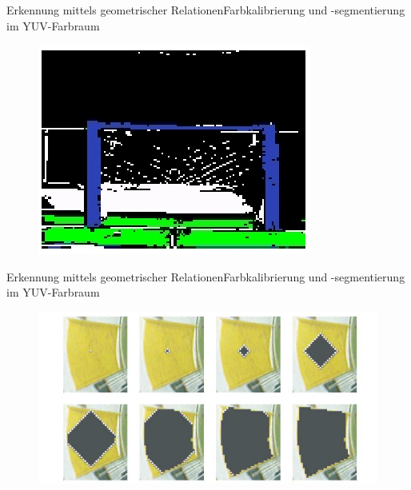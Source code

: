 \documentclass{beamer}
\begin{document}
\begin{frame}{Erkennung mittels geometrischer Relationen}{Farbkalibrierung und -segmentierung im YUV-Farbraum}
\begin{figure}[htp]
\centering
\includegraphics[scale=0.9]{segmented-view2.png}
\end{figure}
\end{frame}

\begin{frame}{Erkennung mittels geometrischer Relationen}{Farbkalibrierung und -segmentierung im YUV-Farbraum}
\begin{figure}[htp]
\centering
\includegraphics[scale=0.7]{region-growing.png}
\end{figure}
\end{frame}
\end{document}
